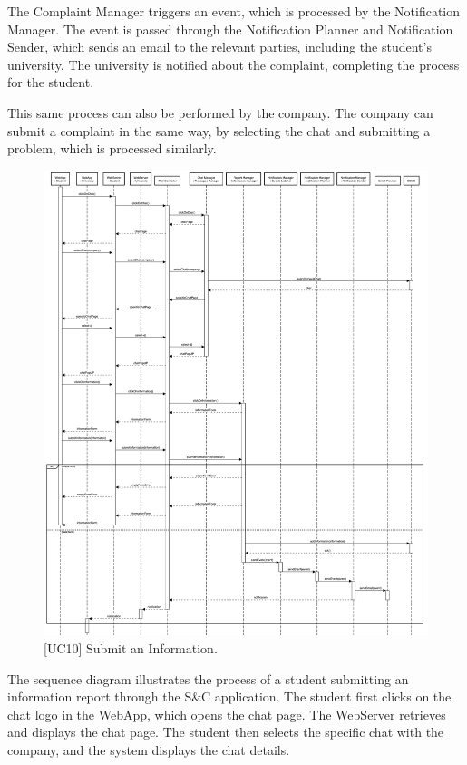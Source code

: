 The Complaint Manager triggers an event, which is processed by the Notification Manager. The event is passed through the Notification Planner and Notification Sender, which sends an email to the relevant parties, including the student's university. The university is notified about the complaint, completing the process for the student.

This same process can also be performed by the company. The company can submit a complaint in the same way, by selecting the chat and submitting a problem, which is processed similarly.

\begin{figure}[htbp]
    \centering
    \includegraphics[width=\linewidth]{DD/Images/sequenceDiagrams/submitInformation.png}
    \caption{[UC10] Submit an Information.}
    \label{fig:submitInformation_immagine}
\end{figure}
\clearpage

The sequence diagram illustrates the process of a student submitting an information report through the S\&C application. The student first clicks on the chat logo in the WebApp, which opens the chat page. The WebServer retrieves and displays the chat page. The student then selects the specific chat with the company, and the system displays the chat details.

